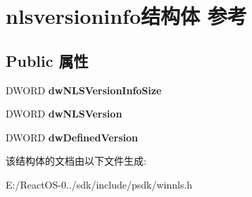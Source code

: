 \hypertarget{structnlsversioninfo}{}\section{nlsversioninfo结构体 参考}
\label{structnlsversioninfo}
\subsection*{Public 属性}
\begin{DoxyCompactItemize}
\item 
\mbox{\label{structnlsversioninfo_abcf2758b0ffef15e0ca1ae1ab79b9cfc}} 
D\+W\+O\+RD {\bfseries dw\+N\+L\+S\+Version\+Info\+Size}
\item 
\mbox{\label{structnlsversioninfo_a0217e9175df2d5a02c59493adbf957cd}} 
D\+W\+O\+RD {\bfseries dw\+N\+L\+S\+Version}
\item 
\mbox{\label{structnlsversioninfo_aee3ff3ecae368a89ca6f1ef1673fd0ac}} 
D\+W\+O\+RD {\bfseries dw\+Defined\+Version}
\end{DoxyCompactItemize}


该结构体的文档由以下文件生成\+:\begin{DoxyCompactItemize}
\item 
E\+:/\+React\+O\+S-\/0../sdk/include/psdk/winnls.\+h\end{DoxyCompactItemize}
